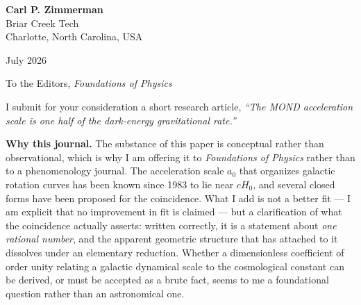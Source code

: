 \documentclass[11pt]{article}
\begin{document}
\noindent
{\large\textbf{Carl P. Zimmerman}}\\
Briar Creek Tech\\
Charlotte, North Carolina, USA

\vspace{0.6em}
\noindent\hrulefill

\vspace{0.8em}
 July 2026

\vspace{1.2em}
\noindent To the Editors, \textit{Foundations of Physics}

\vspace{0.6em}
\noindent
I submit for your consideration a short research article, \textit{``The MOND acceleration scale is one
half of the dark-energy gravitational rate.''}

\vspace{0.6em}
\noindent\textbf{Why this journal.}
The substance of this paper is conceptual rather than observational, which is why I am offering it to
\textit{Foundations of Physics} rather than to a phenomenology journal. The acceleration scale $a_0$ that
organizes galactic rotation curves has been known since 1983 to lie near $cH_0$, and several closed forms
have been proposed for the coincidence. What I add is not a better fit --- I am explicit that no
improvement in fit is claimed --- but a clarification of what the coincidence actually asserts: written
correctly, it is a statement about \emph{one rational number}, and the apparent geometric structure that
has attached to it dissolves under an elementary reduction. Whether a dimensionless coefficient of order
unity relating a galactic dynamical scale to the cosmological constant can be derived, or must be
accepted as a brute fact, seems to me a foundational question rather than an astronomical one.
\end{document}
